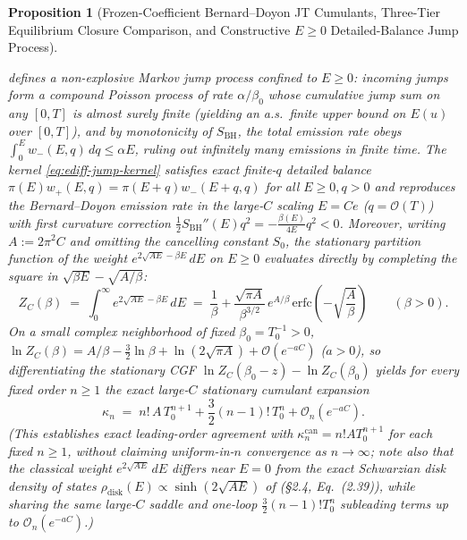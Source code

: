 \documentclass[11pt,a4paper]{article}
\newtheorem{proposition}{Proposition}
\theoremstyle{definition}
\theoremstyle{remark}
\newcommand{\1}{\mathbf{1}}
\begin{document}
\begin{proposition}[Frozen-Coefficient Bernard--Doyon JT Cumulants, Three-Tier Equilibrium Closure Comparison, and Constructive $E\ge 0$ Detailed-Balance Jump Process]
\begin{enumerate}
  defines a \emph{non-explosive} Markov jump process confined to $E\ge 0$: incoming jumps form a compound Poisson process of rate $\alpha/\beta_0$ whose cumulative jump sum on any $[0,T]$ is almost surely finite (yielding an a.s.\ finite upper bound on $E(u)$ over $[0,T]$), and by monotonicity of $S_{\mathrm{BH}}$, the total emission rate obeys $\int_0^E w_-(E,q)\,dq \le \alpha E$, ruling out infinitely many emissions in finite time. The kernel \eqref{eq:ediff-jump-kernel} satisfies \emph{exact finite-$q$ detailed balance} $\pi(E)w_+(E,q) = \pi(E+q)w_-(E+q,q)$ for all $E\ge 0, q>0$ and reproduces the Bernard--Doyon emission rate in the large-$C$ scaling $E=Ce$ ($q=\mathcal{O}(T)$) with first curvature correction $\frac{1}{2}S_{\mathrm{BH}}''(E)q^2 = -\frac{\beta(E)}{4E}q^2 < 0$. Moreover, writing $A := 2\pi^2 C$ and omitting the cancelling constant $S_0$, the stationary partition function of the weight $e^{2\sqrt{AE}-\beta E}\,dE$ on $E\ge 0$ evaluates directly by completing the square in $\sqrt{\beta E}-\sqrt{A/\beta}$:
  \begin{equation}\label{eq:ediff-partition}
    Z_C(\beta) \;=\; \int_0^\infty e^{2\sqrt{AE}-\beta E}\,dE
    \;=\; \frac{1}{\beta} + \frac{\sqrt{\pi A}}{\beta^{3/2}}\,e^{A/\beta}\,\mathrm{erfc}\!\left(-\sqrt{\frac{A}{\beta}}\right)
    \qquad (\beta > 0).
  \end{equation}
  On a small complex neighborhood of fixed $\beta_0 = T_0^{-1} > 0$, $\ln Z_C(\beta) = A/\beta - \frac{3}{2}\ln\beta + \ln(2\sqrt{\pi A}) + \mathcal{O}(e^{-aC})$ ($a>0$), so differentiating the stationary CGF $\ln Z_C(\beta_0-z)-\ln Z_C(\beta_0)$ yields for every \emph{fixed} order $n\ge 1$ the exact large-$C$ stationary cumulant expansion
  \begin{equation}\label{eq:ediff-cumulants}
    \kappa_n \;=\; n!\,A\,T_0^{n+1} + \frac{3}{2}(n-1)!\,T_0^n + \mathcal{O}_n(e^{-aC}).
  \end{equation}
  (This establishes exact leading-order agreement with $\kappa_n^{\mathrm{can}} = n! A T_0^{n+1}$ for each fixed $n\ge 1$, without claiming uniform-in-$n$ convergence as $n\to\infty$; note also that the classical weight $e^{2\sqrt{AE}}\,dE$ differs near $E=0$ from the exact Schwarzian disk density of states $\rho_{\mathrm{disk}}(E)\propto\sinh(2\sqrt{AE})$ of \cite{StanfordWitten2017} (\S2.4, Eq.~(2.39)), while sharing the same large-$C$ saddle and one-loop $\frac{3}{2}(n-1)!T_0^n$ subleading terms up to $\mathcal{O}_n(e^{-aC})$.)
\end{enumerate}
\end{proposition}
\end{document}
